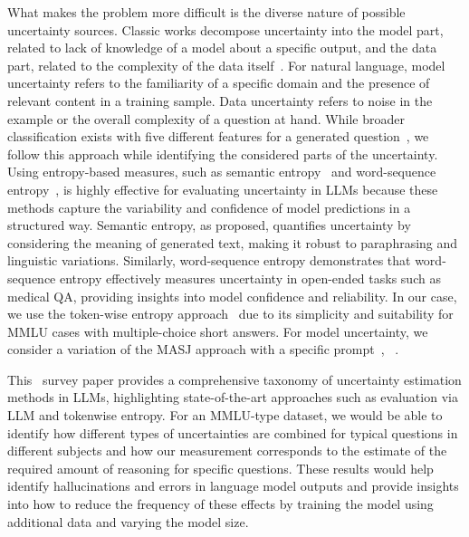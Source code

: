 What makes the problem more difficult is the diverse nature of possible uncertainty sources.
Classic works decompose uncertainty into the model part, related to lack of knowledge of a model about a specific output, and the data part, related to the complexity of the data itself~\cite{hullermeier2021aleatoric}.
For natural language, model uncertainty refers to the familiarity of a specific domain and the presence of relevant content in a training sample.
Data uncertainty refers to noise in the example or the overall complexity of a question at hand.
While broader classification exists with five different features for a generated question~\cite{wan2024sciqag}, we follow this approach while identifying the considered parts of the uncertainty. Using entropy-based measures, such as semantic entropy~\cite{kuhn2023semanticuncertaintylinguisticinvariances} and word-sequence entropy~\cite{wang2024wordsequenceentropyuncertaintyestimation}, is highly effective for evaluating uncertainty in LLMs because these methods capture the variability and confidence of model predictions in a structured way. Semantic entropy, as proposed, quantifies uncertainty by considering the meaning of generated text, making it robust to paraphrasing and linguistic variations. Similarly, word-sequence entropy demonstrates that word-sequence entropy effectively measures uncertainty in open-ended tasks such as medical QA, providing insights into model confidence and reliability. In our case, we use the token-wise entropy approach~\cite{kadavath2022language} due to its simplicity and suitability for MMLU cases with multiple-choice short answers.
For model uncertainty, we consider a variation of the MASJ approach with a specific prompt~\cite{zheng2023judging}, ~\cite{chern2024largelanguagemodelstrusted}.

This~\cite{shorinwa2024surveyuncertaintyquantificationlarge} survey paper provides a comprehensive taxonomy of uncertainty estimation methods in LLMs, highlighting state-of-the-art approaches such as evaluation via LLM and tokenwise entropy.
For an MMLU-type dataset, we would be able to identify how different types of uncertainties are combined for typical questions in different subjects and how our measurement corresponds to the estimate of the required amount of reasoning for specific questions.
These results would help identify hallucinations and errors in language model outputs and provide insights into how to reduce the frequency of these effects by training the model using additional data and varying the model size.